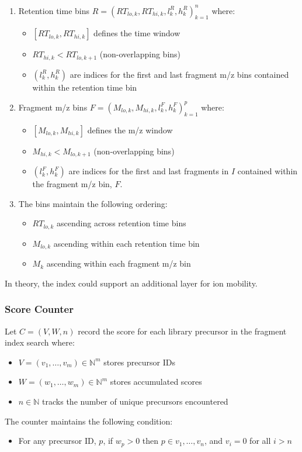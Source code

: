 \documentclass[pdflatex,sn-nature]{sn-jnl}
\begin{document}
\begin{enumerate}
\item Retention time bins $R = {(RT_{lo,k}, RT_{hi,k}, l_k^R, h_k^R)}_{k=1}^n$ where:
    \begin{itemize} 
        \item $[RT_{lo,k}, RT_{hi,k}]$ defines the time window
        \item $RT_{hi,k} < RT_{lo,k+1}$ (non-overlapping bins)
        \item $(l_k^R, h_k^R)$ are indices for the first and last fragment m/z bins contained within the retention time bin
    \end{itemize}
\item Fragment m/z bins $F = {(M_{lo,k}, M_{hi,k}, l_k^F, h_k^F)}_{k=1}^p$ where:
    \begin{itemize} 
        \item $[M_{lo,k}, M_{hi,k}]$ defines the m/z window
        \item $M_{hi,k} < M_{lo,k+1}$ (non-overlapping bins)
        \item $(l_k^F, h_k^F)$ are indices for the first and last fragments in $I$ contained within the fragment m/z bin, $F$. 
    \end{itemize}
\item The bins maintain the following ordering:
    \begin{itemize}
        \item $RT_{lo,k}$ ascending across retention time bins
        \item $M_{lo,k}$ ascending within each retention time bin
        \item $M_k$ ascending within each fragment m/z bin
    \end{itemize}
\end{enumerate}
In theory, the index could support an additional layer for ion mobility. 

\subsubsection{Score Counter}
Let $C = (V, W, n)$ record the score for each library precursor in the fragment index search where:
\begin{itemize}
    \item $V = (v_1,\ldots,v_m) \in \mathbb{N}^m$ stores precursor IDs
    \item $W = (w_1,\ldots,w_m) \in \mathbb{N}^m$ stores accumulated scores
    \item $n \in \mathbb{N}$ tracks the number of unique precursors encountered
\end{itemize}
The counter maintains the following condition:
\begin{itemize}
\item For any precursor ID, $p$, if $w_p > 0$ then $p \in {v_1,\ldots,v_n}$, and 
$v_i = 0$ for all $i > n$
\end{itemize}
\end{document}
